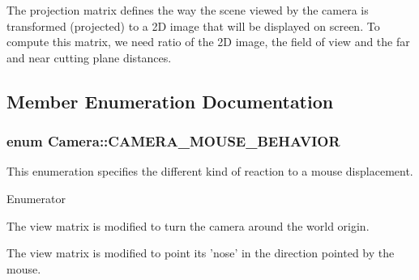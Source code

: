 The projection matrix defines the way the scene viewed by the camera is transformed (projected) to a 2\+D image that will be displayed on screen. To compute this matrix, we need ratio of the 2\+D image, the field of view and the far and near cutting plane distances. 

\subsection{Member Enumeration Documentation}
\hypertarget{classCamera_a39b92a45686a6f858a3405ee34a95cfa}{
\subsubsection[{C\+A\+M\+E\+R\+A\+\_\+\+M\+O\+U\+S\+E\+\_\+\+B\+E\+H\+A\+V\+I\+O\+R}]{\setlength{\rightskip}{0pt plus 5cm}enum {\bf Camera\+::\+C\+A\+M\+E\+R\+A\+\_\+\+M\+O\+U\+S\+E\+\_\+\+B\+E\+H\+A\+V\+I\+O\+R}}}\label{classCamera_a39b92a45686a6f858a3405ee34a95cfa}
This enumeration specifies the different kind of reaction to a mouse displacement. \begin{Desc}
\item[Enumerator]\par
\begin{description}
\item[{\em 
\hypertarget{classCamera_a39b92a45686a6f858a3405ee34a95cfaa8554ee8f8de95ea3a84d77e3e8345d1c}{A\+R\+C\+B\+A\+L\+L\+\_\+\+B\+E\+H\+A\+V\+I\+O\+R}\label{classCamera_a39b92a45686a6f858a3405ee34a95cfaa8554ee8f8de95ea3a84d77e3e8345d1c}
}]The view matrix is modified to turn the camera around the world origin. \item[{\em 
\hypertarget{classCamera_a39b92a45686a6f858a3405ee34a95cfaa37a95995e7b876b0b9994a131da60717}{S\+P\+A\+C\+E\+S\+H\+I\+P\+\_\+\+B\+E\+H\+A\+V\+I\+O\+R}\label{classCamera_a39b92a45686a6f858a3405ee34a95cfaa37a95995e7b876b0b9994a131da60717}
}]The view matrix is modified to point its 'nose' in the direction pointed by the mouse. \end{description}
\end{Desc}


